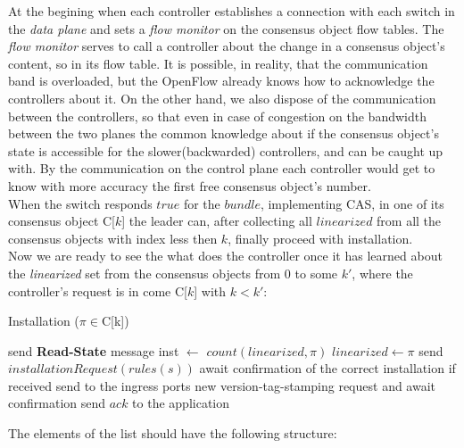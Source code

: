 \documentclass{article}
\theoremstyle{remark}
\begin{document}
%
At the begining when each controller establishes a connection with each switch in the \emph{data plane} and sets a \emph{flow monitor} on the consensus object flow tables. The \emph{flow monitor} serves to call a controller about the change in a consensus object's content, so in its flow table. It is possible, in reality, that the communication band is overloaded, but the OpenFlow already knows how to acknowledge the controllers about it. On the other hand, we also dispose of the communication between the controllers, so that even in case of congestion on the bandwidth between the two planes the common knowledge about if the consensus object's state is accessible for the slower(backwarded) controllers, and can be caught up with.
By the communication on the control plane each controller would get to know with more accuracy the first free consensus object's number.
\\ 
When  the switch responds $true$ for the $bundle$, implementing CAS, in one of its  consensus object C[$k$] the leader can, after collecting all $linearized$ from all the consensus objects with index less then $k$, finally proceed with installation.\\
Now we are ready to see the what does the controller once it has learned about the \emph{linearized} set from the consensus objects from 0 to some $k'$, where the controller's request is in come C[$k$] with $k<k'$:
\begin{algorithm}
 \caption{Installation ($\pi\in$C[k])}
 \begin{algorithmic}[1]\label{Inst}
 	\State send \textbf{Read-State} message
 \EndFor
 \State inst $\gets$ $count(linearized, \pi)$
 	\State $linearized\gets \pi$
 	  send $installationRequest(rules(s))$
 	\EndFor
 	\State await confirmation of the correct installation
 	\State if received send to the ingress ports new version-tag-stamping request and await confirmation
 	\State send $ack$ to the application
 \EndIf
 \end{algorithmic}
\end{algorithm}
The elements of the list should have the following structure:\\
\end{document}
